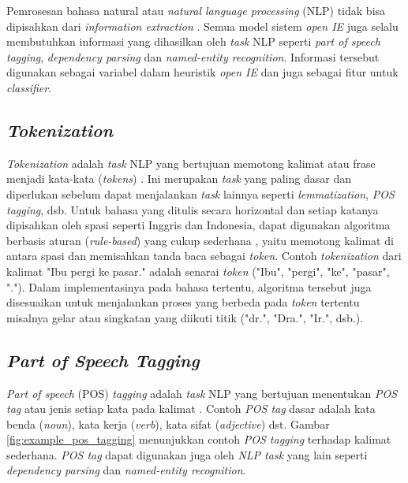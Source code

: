 Pemrosesan bahasa natural atau \textit{natural language processing} (NLP) tidak bisa dipisahkan dari \textit{information extraction} \citep{banko2007open,fader2011identifying,etzioni2011open,angeli2015leveraging}. Semua model sistem \textit{open IE} juga selalu membutuhkan informasi yang dihasilkan oleh \textit{task} NLP seperti \textit{part of speech tagging}, \textit{dependency parsing} dan \textit{named-entity recognition}. Informasi tersebut digunakan sebagai variabel dalam heuristik \textit{open IE} dan juga sebagai fitur untuk \textit{classifier}.

\subsection{\textit{Tokenization}}

\textit{Tokenization} adalah \textit{task} NLP yang bertujuan memotong kalimat atau frase menjadi kata-kata (\textit{tokens}) \citep{manning2008introduction}. Ini merupakan \textit{task} yang paling dasar dan diperlukan sebelum dapat menjalankan \textit{task} lainnya seperti \textit{lemmatization}, \textit{POS tagging}, dsb. Untuk bahasa yang ditulis secara horizontal dan setiap katanya dipisahkan oleh spasi seperti Inggris dan Indonesia, dapat digunakan algoritma berbasis aturan (\textit{rule-based}) yang cukup sederhana \citep{manningptbtokenizer}, yaitu memotong kalimat di antara spasi dan memisahkan tanda baca sebagai \textit{token}. Contoh \textit{tokenization} dari kalimat "Ibu pergi ke pasar." adalah senarai \textit{token} ("Ibu", "pergi", "ke", "pasar", "."). Dalam implementasinya pada bahasa tertentu, algoritma tersebut juga disesuaikan untuk menjalankan proses yang berbeda pada \textit{token} tertentu misalnya gelar atau singkatan yang diikuti titik ("dr.", "Dra.", "Ir.", dsb.).

\subsection{\textit{Part of Speech Tagging}}

\textit{Part of speech} (POS) \textit{tagging} adalah \textit{task} NLP yang bertujuan menentukan \textit{POS tag} atau jenis setiap kata pada kalimat \citep{jurafsky2000speech}. Contoh \textit{POS tag} dasar adalah kata benda (\textit{noun}), kata kerja (\textit{verb}), kata sifat (\textit{adjective}) dst. Gambar \ref{fig:example_pos_tagging} menunjukkan contoh \textit{POS tagging} terhadap kalimat sederhana. \textit{POS tag} dapat digunakan juga oleh \textit{NLP task} yang lain seperti \textit{dependency parsing} dan \textit{named-entity recognition}.

